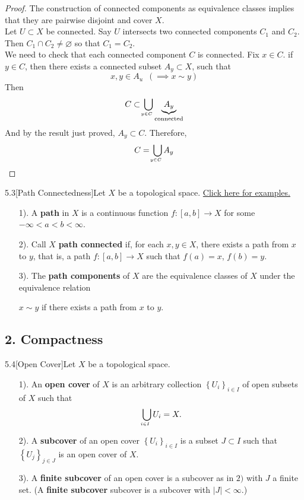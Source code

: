\begin{proof}
The construction of connected components as equivalence classes implies that they are pairwise disjoint and cover $X$.\\
Let $U \subset X$ be connected. Say $U$ intersects two connected components $C_1$ and $C_2$. Then $C_1 \cap C_2 \neq \varnothing$ so that $C_1 = C_2$.\\
We need to check that each connected component $C$ is connected. Fix $x \in C$. if $y \in C$, then there exists a connected subset $A_y \subset X$, such that 
$$x, y \in A_u\,\,\, (\implies x \sim y)$$
Then 
$$C \subset \underaccent{y\in C}{\bigcup} \underbrace{A_y}_{\text{connected}}$$
And by the result just proved, $A_y \subset C$. Therefore,
$$C = \underaccent{y\in C}{\bigcup} A_y$$
\end{proof}

\begin{customdefinition}{5.3}[Path Connectedness]Let $X$ be a topological space. \hypertarget{Definition_5.3}{\hyperlink{ex.d.5.3}{Click here for examples.}}
\begin{enumerate}
    \item[1).] A {\bf path} in $X$ is a continuous function $f: [a,b] \longrightarrow X$ for some $-\infty < a < b < \infty$.
    \item[2).] Call $X$ {\bf path connected} if, for each $x, y \in X$, there exists a path from $x$ to $y$, that is, a path $f: [a,b] \longrightarrow X$ such that $f(a) = x$, $f(b) = y$.
    \item[3).] The {\bf path components} of $X$ are the equivalence classes of $X$ under the equivalence relation
    \begin{center}
        $x \sim y$ if there exists a path from $x$ to $y$.
    \end{center}
\end{enumerate}
\end{customdefinition}

\subsection*{2. Compactness}

\begin{customdefinition}{5.4}[Open Cover]Let $X$ be a topological space. 
\begin{enumerate}
    \item[1).] An {\bf open cover} of $X$ is an arbitrary collection $\left\{U_i\right\}_{i \in I}$ of open subsets of $X$ such that
    $$\underaccent{i \in I}{\bigcup} U_i = X.$$
    \item[2).] A {\bf subcover} of an open cover $\left\{U_i\right\}_{i \in I}$ is a subset $J \subset I$ such that $\left\{U_j\right\}_{j \in J}$ is an open cover of $X$.
    \item[3).] A {\bf finite subcover} of an open cover is a subcover as in $2)$ with $J$ a finite set. (A {\bf finite subcover} subcover is a subcover with $|J| < \infty$.)
\end{enumerate}
\end{customdefinition}

